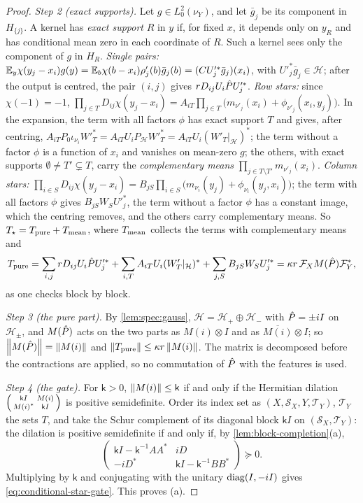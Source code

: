 \begin{proof}
\emph{Step 2 (exact supports).} Let $g\in L^2_0(\nu_Y)$, and let $\bar g_j$ be its
component in $H_{\{j\}}$. A kernel has \emph{exact support} $R$ in $y$ if, for
fixed $x$, it depends only on $y_R$ and has conditional mean zero in each
coordinate of $R$. Such a kernel sees only the component of $g$ in $H_R$. \emph{Single pairs:}
$\mathbb E_y\chi(y_j-x_i)g(y)=\mathbb E_b\chi(b-x_i)\rho'_j(b)\bar g_j(b)=(CU'^*_j\bar g_j)(x_i)$, with
$U'^*_j\bar g_j\in\mathcal H$; after the output is centred, the pair $(i,j)$ gives
$rD_{ij}U_i\hat P U'^*_j$. \emph{Row stars:} since $\chi(-1)=-1$,
$\prod_{j\in T}D_{ij}\chi(y_j-x_i)=A_{iT}\prod_{j\in T}\bigl(m_{\nu'_j}(x_i)
+\phi_{\nu'_j}(x_i,y_j)\bigr)$. In the expansion, the term with all factors $\phi$ has
exact support $T$ and gives, after centring,
$A_{iT}P_0\iota_{\nu_i}W'^*_T=A_{iT}U_iP_{\mathcal H}W'^*_T=A_{iT}U_i(W'_T|_{\mathcal H})^*$;
the term without a factor $\phi$ is a function of $x_i$ and vanishes on mean-zero $g$;
the others, with exact supports $\emptyset\ne T'\subsetneq T$, carry the
\emph{complementary means} $\prod_{j\in T\setminus T'}m_{\nu'_j}(x_i)$. \emph{Column
stars:} $\prod_{i\in S}D_{ij}\chi(y_j-x_i)=B_{jS}\prod_{i\in S}\bigl(m_{\nu_i}(y_j)
+\phi_{\nu_i}(y_j,x_i)\bigr)$; the term with all factors $\phi$ gives
$B_{jS}W_SU'^*_j$, the term without a factor $\phi$ has a constant image, which the
centring removes, and the others carry complementary means. So
$T_\star=T_{\rm pure}+T_{\rm mean}$, where $T_{\rm mean}$ collects the terms with
complementary means and
\[
 T_{\rm pure}=\sum_{i,j}rD_{ij}U_i\hat P U'^*_j+\sum_{i,T}A_{iT}U_i(W'_T|_{\mathcal H})^*
 +\sum_{j,S}B_{jS}W_SU'^*_j=\kappa r\,\mathcal F_XM(\hat P)\mathcal F_Y^*,
\]
as one checks block by block.

\emph{Step 3 (the pure part).} By \cref{lem:spec:gauss},
$\mathcal H=\mathcal H_+\oplus\mathcal H_-$ with $\hat P=\pm iI$ on $\mathcal H_\pm$, and
$M(\hat P)$ acts on the two parts as $M(i)\otimes I$ and as $\overline{M(i)}\otimes I$;
so $\left\|M(\hat P)\right\|=\left\|M(i)\right\|$ and $\left\|T_{\rm pure}\right\|\le\kappa r\left\|M(i)\right\|$. The
matrix is decomposed before the contractions are applied, so no commutation of $\hat P$
with the features is used.

\emph{Step 4 (the gate).} For $\mathsf k>0$, $\left\|M(i)\right\|\le\mathsf k$ if and only if
the Hermitian dilation $\begin{psmallmatrix}\mathsf kI&M(i)\\M(i)^*&\mathsf kI
\end{psmallmatrix}$ is positive semidefinite. Order its index set as
$(X,\mathcal S_X,Y,\mathcal T_Y)$, $\mathcal T_Y$ the sets $T$, and take the Schur
complement of its diagonal block $\mathsf kI$ on $(\mathcal S_X,\mathcal T_Y)$: the
dilation is positive semidefinite if and only if, by
\cref{lem:block-completion}(a),
\[
 \begin{pmatrix}\mathsf kI-\mathsf k^{-1}AA^*&iD\\-iD^*&\mathsf kI-\mathsf k^{-1}BB^*
 \end{pmatrix}\succeq0 .
\]
Multiplying by $\mathsf k$ and conjugating with the unitary $\operatorname{diag}(I,-iI)$ gives
\eqref{eq:conditional-star-gate}. This proves (a).


\end{proof}
